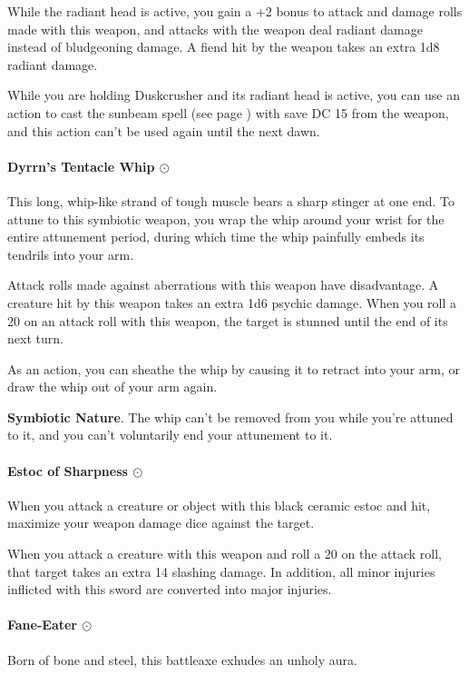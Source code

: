         While the radiant head is active, you gain a +2 bonus to attack and damage rolls made with this weapon, and attacks with the weapon deal radiant damage instead of bludgeoning damage.
        A fiend hit by the weapon takes an extra 1d8 radiant damage.

        While you are holding Duskcrusher and its radiant head is active, you can use an action to cast the sunbeam spell (see page \pageref{spell::sunbeam}) with save DC 15 from the weapon, and this action can't be used again until the next dawn.
    \paragraph{Dyrrn's Tentacle Whip $\odot$}
        This long, whip-like strand of tough muscle bears a sharp stinger at one end.
        To attune to this symbiotic weapon, you wrap the whip around your wrist for the entire attunement period, during which time the whip painfully embeds its tendrils into your arm.

        Attack rolls made against aberrations with this weapon have disadvantage.
        A creature hit by this weapon takes an extra 1d6 psychic damage.
        When you roll a 20 on an attack roll with this weapon, the target is stunned until the end of its next turn.

        As an action, you can sheathe the whip by causing it to retract into your arm, or draw the whip out of your arm again.

        \textbf{Symbiotic Nature}.
        The whip can't be removed from you while you're attuned to it, and you can't voluntarily end your attunement to it.
    \paragraph{Estoc of Sharpness $\odot$}
        When you attack a creature or object with this black ceramic estoc and hit, maximize your weapon damage dice against the target.

        When you attack a creature with this weapon and roll a 20 on the attack roll, that target takes an extra 14 slashing damage.
        In addition, all minor injuries inflicted with this sword are converted into major injuries.
    \paragraph{Fane-Eater $\odot$}
        Born of bone and steel, this battleaxe exhudes an unholy aura.

